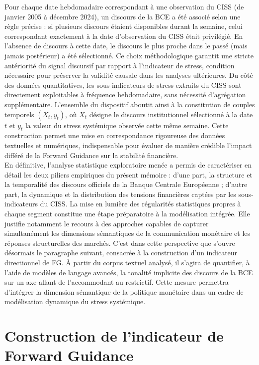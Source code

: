 Pour chaque date hebdomadaire correspondant à une observation du CISS (de janvier 2005 à décembre 2024), un discours de la BCE a été associé selon une règle précise : si plusieurs discours étaient disponibles durant la semaine, celui correspondant exactement à la date d’observation du CISS était privilégié. En l’absence de discours à cette date, le discours le plus proche dans le passé (mais jamais postérieur) a été sélectionné. Ce choix méthodologique garantit une stricte antériorité du signal discursif par rapport à l’indicateur de stress, condition nécessaire pour préserver la validité causale dans les analyses ultérieures. Du côté des données quantitatives, les sous-indicateurs de stress extraits du CISS sont directement exploitables à fréquence hebdomadaire, sans nécessité d’agrégation supplémentaire. L’ensemble du dispositif aboutit ainsi à la constitution de couples temporels $(X_t, y_t)$, où $X_t$ désigne le discours institutionnel sélectionné à la date $t$ et $y_t$ la valeur du stress systémique observée cette même semaine. Cette construction permet une mise en correspondance rigoureuse des données textuelles et numériques, indispensable pour évaluer de manière crédible l’impact différé de la Forward Guidance sur la stabilité financière.\\

En définitive, l’analyse statistique exploratoire menée a permis de caractériser en détail les deux piliers empiriques du présent mémoire : d’une part, la structure et la temporalité des discours officiels de la Banque Centrale Européenne ; d’autre part, la dynamique et la distribution des tensions financières captées par les sous-indicateurs du CISS. La mise en lumière des régularités statistiques propres à chaque segment constitue une étape préparatoire à la modélisation intégrée. Elle justifie notamment le recours à des approches capables de capturer simultanément les dimensions sémantiques de la communication monétaire et les réponses structurelles des marchés. C’est dans cette perspective que s’ouvre désormais le paragraphe suivant, consacrée à la construction d’un indicateur directionnel de FG. À partir du corpus textuel analysé, il s’agira de quantifier, à l’aide de modèles de langage avancés, la tonalité implicite des discours de la BCE sur un axe allant de l’accommodant au restrictif. Cette mesure permettra d’intégrer la dimension sémantique de la politique monétaire dans un cadre de modélisation dynamique du stress systémique.

\section{Construction de l’indicateur de Forward Guidance}

